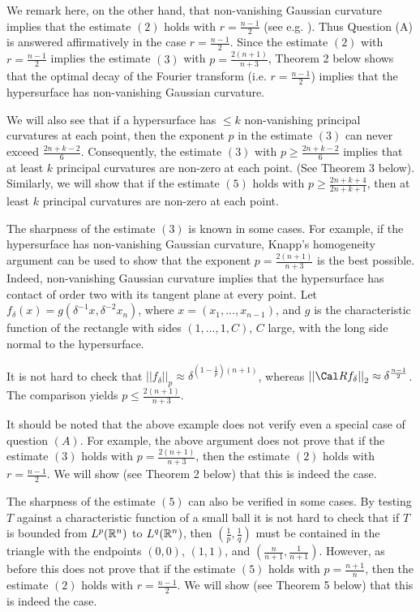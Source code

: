 We remark here, on the other hand,  that  non-vanishing Gaussian curvature implies that the estimate
$(2)$ holds with $r=\frac{n-1}{2}$ (see e.g. \cite{S}). Thus Question (A) 
is answered  affirmatively in the case $r=\frac{n-1}{2}$. Since the estimate 
$(2)$ with $r=\frac{n-1}{2}$ implies the estimate $(3)$ with 
$p=\frac{2(n+1)}{n+3}$, Theorem 2 below shows that the optimal decay of 
the Fourier transform (i.e. $r=\frac{n-1}{2}$) implies that the hypersurface
has non-vanishing Gaussian curvature. 




We will also see that if a hypersurface has $\leq k$ non-vanishing 
principal curvatures at each point, then the exponent $p$ in the estimate
$(3)$ can never exceed $\frac{2n+k-2}{6}$. Consequently, the estimate 
$(3)$ with $p\ge \frac{2n+k-2}{6}$ implies that at least $k$ principal 
curvatures are non-zero at each point. (See Theorem 3 below). Similarly, we  
will show that if the estimate $(5)$ holds with 
$p\ge \frac{2n+k+4}{2n+k+1}$, then at least $k$ principal curvatures are
non-zero at each point.  


The sharpness of the estimate $(3)$ is known in some cases. For example, if
the hypersurface has non-vanishing Gaussian curvature, Knapp's homogeneity 
argument can be used to show that the exponent $p=\frac{2(n+1)}{n+3}$ is the 
best possible. Indeed, non-vanishing Gaussian curvature 
implies that the hypersurface has contact of order two with its 
tangent plane at every point. Let 
$f_{\delta}(x)=g({\delta}^{-1}x, {\delta}^{-2}x_n)$, where 
$x=(x_1,...,x_{n-1})$, and $g$ is the characteristic function 
of the rectangle with sides $(1,...,1,C)$, $C$ large, with the long side
normal to the hypersurface. 

It is not hard to check that 
${||f_{\delta}||}_p \approx {\delta}^{(1-\frac{1}{p})(n+1)}$, whereas 
${||{\Cal R}f_{\delta}||}_2 \approx {\delta}^{\frac{n-1}{2}}$. The    
comparison yields $p\leq \frac{2(n+1)}{n+3}$.  

It should be noted that the above example does not verify even a special  
case of question $(A)$. For example, the above argument does not prove that 
if the estimate $(3)$ holds with $p=\frac{2(n+1)}{n+3}$, then the estimate  
$(2)$ holds with $r=\frac{n-1}{2}$. We will show (see Theorem 2 below) that 
this is indeed the case. 

The sharpness of the estimate $(5)$ can also be verified in some cases. 
By testing $T$ against a characteristic function of a small ball it is not
hard to check that if $T$ is bounded from $L^p({\Bbb R}^n)$ to 
$L^q({\Bbb R}^n)$, then $(\frac{1}{p}, \frac{1}{q})$ must be contained in
the triangle with the endpoints $(0,0)$, $(1,1)$, and 
$(\frac{n}{n+1}, \frac{1}{n+1})$. However, as before this does not prove that
if the estimate $(5)$ holds with $p=\frac{n+1}{n}$, then the estimate 
$(2)$ holds with $r=\frac{n-1}{2}$. We will show (see Theorem 5 below) that
this is indeed the case. 

